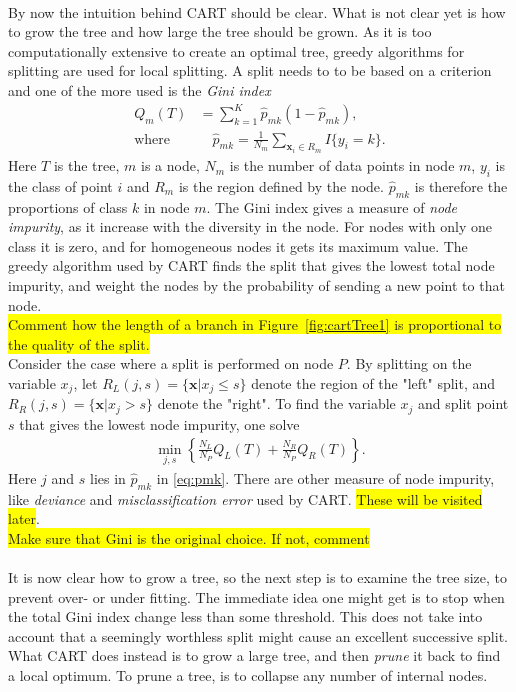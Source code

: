 %
\\
By now the intuition behind CART should be clear. What is not clear yet is how to grow the tree and how large the tree should be grown. As it is too computationally extensive to create an optimal tree, greedy algorithms for splitting are used for local splitting. A split needs to to be based on a criterion and one of the more used is the \textit{Gini index}
\begin{align}
  Q_m(T) &= \sum^{K}_{k=1} \hat{p}_{mk} (1 - \hat{p}_{mk}),  \\ 
  \label{eq:pmk} 
  \text{where}& \quad \hat{p}_{mk} = \frac{1}{N_m} \sum_{\mathbf{x}_i \in R_m} I\{y_i = k\}.
\end{align}
Here $T$ is the tree, $m$ is a node, $N_m$ is the number of data points in node $m$, $y_i$ is the class of point $i$ and $R_m$ is the region defined by the node.
$\hat{p}_{mk}$ is therefore the proportions of class $k$ in node $m$.
The Gini index gives a measure of \textit{node impurity}, as it increase with the diversity in the node. For nodes with only one class it is zero, and for homogeneous nodes it gets its maximum value. The greedy algorithm used by CART finds the split that gives the lowest total node impurity, and weight the nodes by the probability of sending a new point to that node.   
\\ \colorbox{yellow}{Comment how the length of a branch in Figure~\ref{fig:cartTree1} is proportional to the quality of the split.} \\ 
Consider the case where a split is performed on node $P$. By splitting on the variable $x_j$, let $R_L(j,s) = \{\mathbf{x} | x_j \leq s\}$ denote the region of the "left" split,  and $R_R(j,s) = \{\mathbf{x} | x_j > s\}$ denote the "right". To find the variable $x_j$ and split point $s$ that gives the lowest node impurity, one solve
\begin{align}
  \min_{j,s} \left\{ \frac{N_L}{N_P} Q_L(T)
  + \frac{N_R}{N_P} Q_R(T) \right\}.
\end{align}
Here $j$ and $s$ lies in $\hat{p}_{mk}$ in \eqref{eq:pmk}.
There are other measure of node impurity, like \textit{deviance} and \textit{misclassification error} used by CART. \colorbox{yellow}{These will be visited later}.\\
\colorbox{yellow}{Make sure that Gini is the original choice. If not, comment} \\
\\
It is now clear how to grow a tree, so the next step is to examine the tree size, to prevent over- or under fitting. The immediate idea one might get is to stop when the total Gini index change less than some threshold. This does not take into account that a seemingly worthless split might cause an excellent successive split. 
What CART does instead is to grow a large tree, and then \textit{prune} it back to find a local optimum. To prune a tree, is to collapse any number of internal nodes. 

